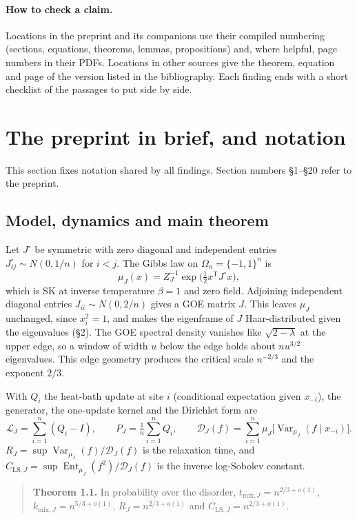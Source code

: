 \documentclass[11pt]{article}
\newcommand{\D}{\mathcal{D}}
\newcommand{\Lgen}{\mathcal{L}}
\DeclareMathOperator{\Var}{Var}
\DeclareMathOperator{\Ent}{Ent}
\newcommand{\ploc}[2]{#1}
\begin{document}
\paragraph{How to check a claim.}
Locations in the preprint and its companions use their compiled numbering
(sections, equations, theorems, lemmas, propositions) and, where helpful, page
numbers in their PDFs. Locations in other sources give the theorem, equation
and page of the version listed in the bibliography. Each finding ends with a
short checklist of the passages to put side by side.
\section{The preprint in brief, and notation}\label{sec:overview}

This section fixes notation shared by all findings. Section numbers \S1--\S20
refer to the preprint.

\subsection{Model, dynamics and main theorem}

Let $J^\circ$ be symmetric with zero diagonal and independent entries
$J^\circ_{ij}\sim N(0,1/n)$ for $i<j$. The Gibbs law on
$\Omega_n=\{-1,1\}^n$ is
\[
 \mu_J(x)=Z_J^{-1}\exp\bigl(\tfrac12 x^{\mathsf T}J^\circ x\bigr),
\]
which is SK at inverse temperature $\beta=1$ and zero field. Adjoining
independent diagonal entries $J_{ii}\sim N(0,2/n)$ gives a GOE matrix $J$. This
leaves $\mu_J$ unchanged, since $x_i^2=1$, and makes the eigenframe of $J$
Haar-distributed given the eigenvalues \ploc{(\S2)}{model.tex:20--27}. The
GOE spectral density vanishes like $\sqrt{2-\lambda}$ at the upper edge, so a
window of width $u$ below the edge holds about $nu^{3/2}$ eigenvalues. This
edge geometry produces the critical scale $n^{-2/3}$ and the exponent $2/3$.

With $Q_i$ the heat-bath update at site $i$ (conditional expectation given
$x_{-i}$), the generator, the one-update kernel and the Dirichlet form are
\[
 \Lgen_J=\sum_{i=1}^n(Q_i-I),\qquad P_J=\tfrac1n\sum_{i=1}^nQ_i,\qquad
 \D_J(f)=\sum_{i=1}^n\mu_J\bigl[\Var_{\mu_J}(f\mid x_{-i})\bigr].
\]
$R_J=\sup\Var_{\mu_J}(f)/\D_J(f)$ is the relaxation time, and
$C_{\mathrm{LS},J}=\sup\Ent_{\mu_J}(f^2)/\D_J(f)$ is the inverse log-Sobolev
constant.

\begin{quote}
\textbf{Theorem 1.1.}\ploc{}{introduction.tex:54--65} In probability over the
disorder, $t_{\mathrm{mix},J}=n^{2/3+o(1)}$, $k_{\mathrm{mix},J}=n^{5/3+o(1)}$,
$R_J=n^{2/3+o(1)}$ and $C_{\mathrm{LS},J}=n^{2/3+o(1)}$.
\end{quote}
\end{document}
